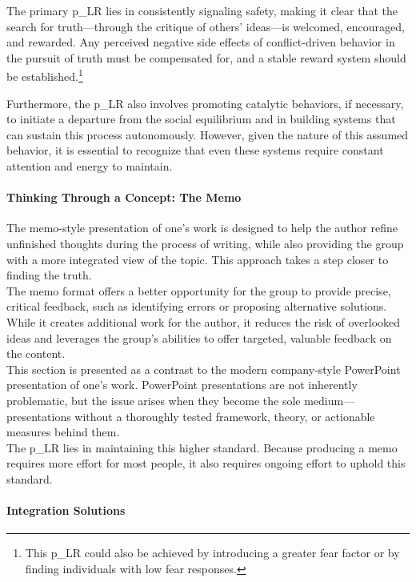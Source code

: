 The primary \gls{p_LR} lies in consistently signaling safety, making it clear that the search for truth—through the critique of others' ideas—is welcomed, encouraged, and rewarded. Any perceived negative side effects of conflict-driven behavior in the pursuit of truth must be compensated for, and a stable reward system should be established.\footnote{
	This \gls{p_LR} could also be achieved by introducing a greater fear factor or by finding individuals with low fear responses.
}

Furthermore, the \gls{p_LR} also involves promoting catalytic behaviors, if necessary, to initiate a departure from the social equilibrium and in building systems that can sustain this process autonomously. However, given the nature of this assumed behavior, it is essential to recognize that even these systems require constant attention and energy to maintain.

\paragraph{Thinking Through a Concept: The Memo}

The memo-style presentation of one’s work is designed to help the author refine unfinished thoughts during the process of writing, while also providing the group with a more integrated view of the topic. This approach takes a step closer to finding the truth.\\

The memo format offers a better opportunity for the group to provide precise, critical feedback, such as identifying errors or proposing alternative solutions. While it creates additional work for the author, it reduces the risk of overlooked ideas and leverages the group's abilities to offer targeted, valuable feedback on the content.\\

This section is presented as a contrast to the modern company-style PowerPoint presentation of one’s work. PowerPoint presentations are not inherently problematic, but the issue arises when they become the sole medium—presentations without a thoroughly tested framework, theory, or actionable measures behind them.\\

The \gls{p_LR} lies in maintaining this higher standard. Because producing a memo requires more effort for most people, it also requires ongoing effort to uphold this standard. 

\paragraph{Integration Solutions}

